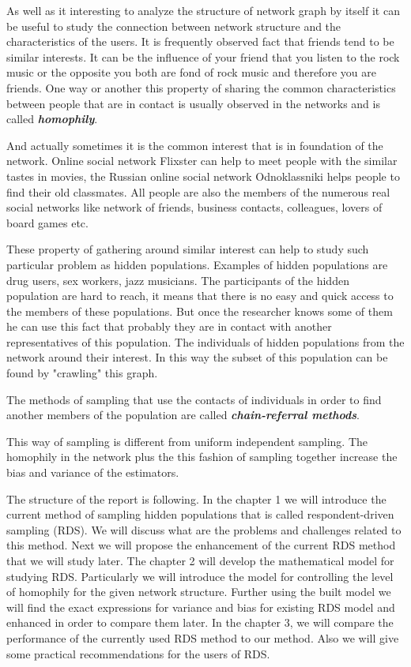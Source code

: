 \documentclass[12pt]{report}
\begin{document}
As well as it interesting to analyze the structure of network graph by itself it can be useful to study the connection between network structure and the characteristics of the users. It is frequently observed fact that friends tend to be similar interests. It can be the influence of your friend that you listen to the rock music or the opposite you both are fond of rock music and therefore you are friends. One way or another this property of sharing the common characteristics between people that are in contact is usually observed in the networks and is called \textit{\textbf{homophily}}.

And actually sometimes it is the common interest that is in foundation of the network. Online social network Flixster can help to meet people with the similar tastes in movies, the Russian online social network Odnoklassniki helps people to find their old classmates. All people are also the members of the numerous real social networks like network of friends, business contacts, colleagues, lovers of board games etc.

These property of gathering around similar interest can help to study such particular problem as hidden populations. Examples of hidden populations are drug users, sex workers, jazz musicians. The participants of the hidden population are hard to reach, it means that there is no easy and quick access to the members of these populations. But once the researcher knows some of them he can use this fact that probably they are in contact with another representatives of this population. The individuals of hidden populations from the network around their interest. In this way the subset of this population can be found by "crawling" this graph.

The methods of sampling that use the contacts of individuals in order to find another members of the population are called \textit{\textbf{chain-referral methods}}.

This way of sampling is different from uniform independent sampling. The homophily in the network plus the this fashion of sampling together increase the bias and variance of the estimators. 

The structure of the report is following.
In the chapter 1 we will introduce the current method of sampling hidden populations that is called respondent-driven sampling (RDS). We will discuss what are the problems and challenges related to this method. Next we will propose the enhancement of the current RDS method that we will study later.
The chapter 2 will develop the mathematical model for studying RDS. Particularly we will introduce the model for controlling the level of homophily for the given network structure. Further using the built model we will find the exact expressions for variance and bias for existing RDS model and enhanced in order to compare them later.
In the chapter 3, we will compare the performance of the currently used RDS method to our method. Also we will give some practical recommendations for the users of RDS.
\end{document}
